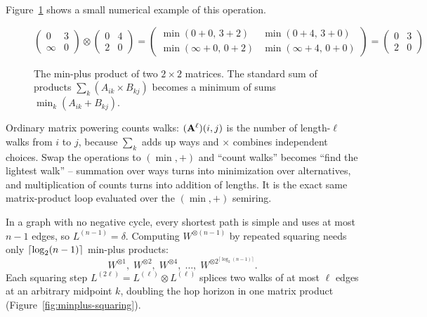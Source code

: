 Figure~\ref{fig:minplus-example} shows a small numerical example of this operation.

\begin{figure}[htbp]
\centering
$
\begin{pmatrix} 0 & 3 \\ \infty & 0 \end{pmatrix}
\otimes
\begin{pmatrix} 0 & 4 \\ 2 & 0 \end{pmatrix}
=
\begin{pmatrix} 
  \min(0+0,\, 3+2) & \min(0+4,\, 3+0) \\
  \min(\infty+0,\, 0+2) & \min(\infty+4,\, 0+0)
\end{pmatrix}
=
\begin{pmatrix} 0 & 3 \\ 2 & 0 \end{pmatrix}
$
\caption{The min-plus product of two $2 \times 2$ matrices. The standard sum of products $\sum_k (A_{ik} \times B_{kj})$ becomes a minimum of sums $\min_k (A_{ik} + B_{kj})$.}
\label{fig:minplus-example}
\end{figure}

\begin{intuitionbox}
Ordinary matrix powering counts walks: $(\mathbf{A}^\ell)(i,j)$ is the number of length-$\ell$ walks from $i$
to $j$, because $\sum_k$ adds up ways and $\times$ combines independent choices. Swap the operations to
$(\min,+)$ and ``count walks'' becomes ``find the lightest walk'' -- summation over ways turns into
minimization over alternatives, and multiplication of counts turns into addition of lengths. It is the
exact same matrix-product loop evaluated over the $(\min,+)$ semiring.
\end{intuitionbox}

In a graph with no negative cycle, every shortest path is simple and uses at most $n-1$ edges, so
$L^{(n-1)}=\delta$. Computing $W^{\otimes(n-1)}$ by repeated squaring needs only
$\lceil\log_2(n-1)\rceil$ min-plus products:
\[
  W^{\otimes 1},\; W^{\otimes 2},\; W^{\otimes 4},\;\dots,\; W^{\otimes 2^{\lceil\log_2(n-1)\rceil}}.
\]
Each squaring step $L^{(2\ell)} = L^{(\ell)} \otimes L^{(\ell)}$ splices two walks of at most $\ell$
edges at an arbitrary midpoint $k$, doubling the hop horizon in one matrix product (Figure~\ref{fig:minplus-squaring}).

